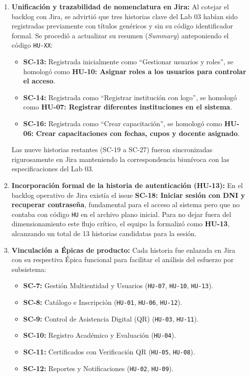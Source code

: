 \begin{enumerate}
    \item \textbf{Unificación y trazabilidad de nomenclatura en Jira:} Al cotejar el backlog con Jira, se advirtió que tres historias clave del Lab 03 habían sido registradas previamente con títulos genéricos y sin su código identificador formal. Se procedió a actualizar su resumen (\textit{Summary}) anteponiendo el código \texttt{HU-XX}:
    \begin{itemize}
        \item \textbf{SC-13:} Registrada inicialmente como \enquote{Gestionar usuarios y roles}, se homologó como \textbf{HU-10: Asignar roles a los usuarios para controlar el acceso}.
        \item \textbf{SC-14:} Registrada como \enquote{Registrar institución con logo}, se homologó como \textbf{HU-07: Registrar diferentes instituciones en el sistema}.
        \item \textbf{SC-16:} Registrada como \enquote{Crear capacitación}, se homologó como \textbf{HU-06: Crear capacitaciones con fechas, cupos y docente asignado}.
    \end{itemize}
    Las nueve historias restantes (SC-19 a SC-27) fueron sincronizadas rigurosamente en Jira manteniendo la correspondencia biunívoca con las especificaciones del Lab 03.
    
    \item \textbf{Incorporación formal de la historia de autenticación (HU-13):} En el backlog operativo de Jira existía el issue \textbf{SC-18: Iniciar sesión con DNI y recuperar contraseña}, fundamental para el acceso al sistema pero que no contaba con código \texttt{HU} en el archivo plano inicial. Para no dejar fuera del dimensionamiento este flujo crítico, el equipo la formalizó como \textbf{HU-13}, alcanzando un total de 13 historias candidatas para la sesión.
    
    \item \textbf{Vinculación a Épicas de producto:} Cada historia fue enlazada en Jira con su respectiva Épica funcional para facilitar el análisis del esfuerzo por subsistema:
    \begin{itemize}
        \item \textbf{SC-7:} Gestión Multientidad y Usuarios (\texttt{HU-07}, \texttt{HU-10}, \texttt{HU-13}).
        \item \textbf{SC-8:} Catálogo e Inscripción (\texttt{HU-01}, \texttt{HU-06}, \texttt{HU-12}).
        \item \textbf{SC-9:} Control de Asistencia Digital (QR) (\texttt{HU-03}, \texttt{HU-11}).
        \item \textbf{SC-10:} Registro Académico y Evaluación (\texttt{HU-04}).
        \item \textbf{SC-11:} Certificados con Verificación QR (\texttt{HU-05}, \texttt{HU-08}).
        \item \textbf{SC-12:} Reportes y Notificaciones (\texttt{HU-02}, \texttt{HU-09}).
    \end{itemize}
    

\end{enumerate}
